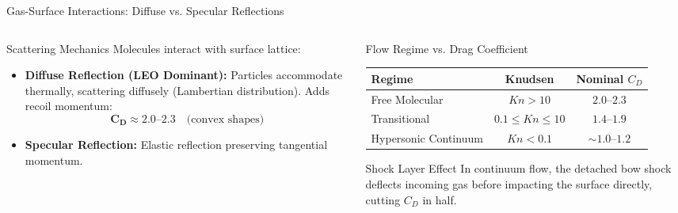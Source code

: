 \documentclass[aspectratio=169,11pt]{beamer}
\begin{document}
\begin{frame}{Gas-Surface Interactions: Diffuse vs. Specular Reflections}
    \begin{columns}[t]
        \begin{column}{0.49\textwidth}
            \begin{block}{Scattering Mechanics}
                \small
                Molecules interact with surface lattice:
                \begin{itemize}\setlength{\itemsep}{1pt}
                    \item \textbf{Diffuse Reflection (LEO Dominant):} Particles accommodate thermally, scattering diffusely (Lambertian distribution). Adds recoil momentum:
                    \begin{equation*}
                        \mathbf{C_D \approx 2.0\text{--}2.3} \quad \text{(convex shapes)}
                    \end{equation*}
                    \item \textbf{Specular Reflection:} Elastic reflection preserving tangential momentum.
                \end{itemize}
            \end{block}
        \end{column}

        \begin{column}{0.48\textwidth}
            \begin{block}{Flow Regime vs. Drag Coefficient}
                \centering
                \scriptsize
                \begin{tabular}{@{}lcc@{}}
                    \toprule
                    \textbf{Regime} & \textbf{Knudsen} & \textbf{Nominal $C_D$} \\ \midrule
                    Free Molecular & $Kn > 10$ & \textbf{$2.0\text{--}2.3$} \\
                    Transitional   & $0.1 \le Kn \le 10$ & $1.4\text{--}1.9$ \\
                    Hypersonic Continuum & $Kn < 0.1$ & \textbf{$\sim 1.0\text{--}1.2$} \\ \bottomrule
                \end{tabular}
            \end{block}
            \vspace{-0.1cm}
            \begin{exampleblock}{Shock Layer Effect}
                \small
                In continuum flow, the detached bow shock deflects incoming gas before impacting the surface directly, cutting $C_D$ in half.
            \end{exampleblock}
        \end{column}
    \end{columns}
\end{frame}
\end{document}
